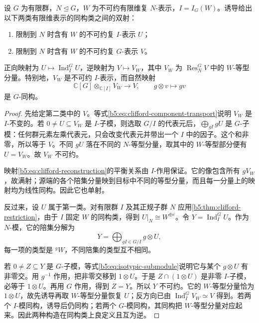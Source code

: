 \begin{theorem}[Clifford 对应]\label{b5:thm:clifford-correspondence}
	设 \(G\) 为有限群，\(N\trianglelefteq G\)，\(W\) 为不可约有限维复 \(N\)-表示，\(I=I_G(W)\)。诱导给出以下两类有限维表示的同构类之间的双射：
	\begin{enumerate}
		\item 限制到 \(N\) 时含有 \(W\) 的不可约复 \(I\)-表示 \(U\)；
		\item 限制到 \(N\) 时含有 \(W\) 的不可约复 \(G\)-表示 \(V\)。
	\end{enumerate}
	正向映射为 \(U\mapsto\operatorname{Ind}_I^G U\)，逆映射为 \(V\mapsto V_W\)，其中 \(V_W\) 为 \(\operatorname{Res}_N^G V\) 中的 \(W\)-等型分量。特别地，\(V_W\) 是不可约 \(I\)-表示，而自然映射
	\begin{equation}\label{b5:eq:clifford-reconstruction}
		\mathbb C[G]\otimes_{\mathbb C[I]}V_W\longrightarrow V, \qquad g\otimes v\longmapsto gv
	\end{equation}
	是 \(G\)-同构。
\end{theorem}
\begin{proof}
	先给定第二类中的 \(V\)。等式\eqref{b5:eq:clifford-component-transport}说明 \(V_W\) 是 \(I\)-不变的。若 \(0\neq U\subseteq V_W\) 是 \(I\)-子模，则选取 \(G/I\) 的代表元后，\(\bigoplus_{gI}gU\) 是 \(G\)-子模：任何群元素左乘代表元，只会改变代表元并带出一个 \(I\) 中的因子。这个和非零，所以等于 \(V\)。不同 \(gU\) 落在不同的 \(N\)-等型分量，取其中的 \(W\)-等型部分便有 \(U=V_W\)。故 \(V_W\) 不可约。

	映射\eqref{b5:eq:clifford-reconstruction}的平衡关系由 \(I\)-作用保证。它的像包含所有 \(gV_W\)，故满射；源端的各个陪集分量映到目标中不同的等型分量，而且每一分量上的映射均为线性同构。因此它也单射。

	反过来，设 \(U\) 属于第一类。对有限群 \(I\) 及其正规子群 \(N\) 应用\cref{b5:thm:clifford-restriction}，由于 \(I\) 固定 \(W\) 的同构类，得到 \(U|_N\cong W^{\oplus e}\)。令 \(Y=\operatorname{Ind}_I^G U\)。作为 \(N\)-模，它的陪集分解为
	\[
		Y=\bigoplus_{gI\in G/I}g\otimes U,
	\]
	每一项的类型是 \({}^gW\)，不同陪集的类型互不相同。

	若 \(0\neq Z\subseteq Y\) 是 \(G\)-子模，等式\eqref{b5:eq:isotypic-submodule}说明它与某个 \(g\otimes U\) 有非零交。用 \(g^{-1}\) 作用，把非零交移到 \(1\otimes U\)。于是 \(Z\cap(1\otimes U)\) 是非零 \(I\)-子模，必等于 \(1\otimes U\)。再用 \(G\) 作用，得到 \(Z=Y\)。所以 \(Y\) 不可约。它的 \(W\)-等型分量恰为 \(1\otimes U\)，故先诱导再取 \(W\)-等型分量恢复 \(U\)；反方向已由 \(\operatorname{Ind}_I^G V_W\simeq V\) 得到。若两个 \(I\)-模同构，诱导后仍同构；若两个 \(G\)-模同构，其同构把 \(W\)-等型分量对应起来。因此两种构造在同构类上良定义且互为逆。
\end{proof}

